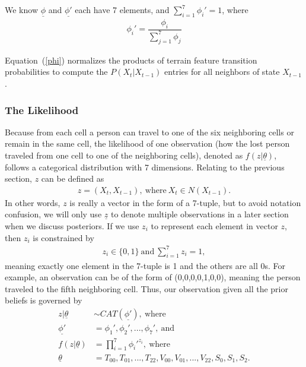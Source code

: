 \documentclass[smallextended,natbib]{svjour3}
\begin{document}
We know $\underline{\phi}$ and $\underline{\phi'}$ each have 7 elements, and $\sum_{i=1}^7 \phi_i' = 1$, where
\begin{align}
\label{phi}
\phi_i' = \dfrac{\phi_i}{\sum_{j=1}^7 \phi_j}
\end{align}

Equation~(\ref{phi}) normalizes the products of terrain feature transition probabilities to compute the $P(X_t|X_{t-1})$ entries for all neighbors of state $X_{t-1}$.

\subsubsection{The Likelihood}
\label{sec:3.4.3}

Because from each cell a person can travel to one of the six neighboring cells or remain in the same cell, the likelihood of one observation (how the lost person traveled from one cell to one of the neighboring cells), denoted as $f(z|\underline{\theta})$, follows a categorical distribution with 7 dimensions. Relating to the previous section, $z$ can be defined as
\begin{align}
z = (X_t, X_{t-1}), ~\mathrm{where}~ X_t \in N(X_{t-1}).
\end{align}
In other words, $z$ is really a vector in the form of a 7-tuple, but to avoid notation confusion, we will only use $\underline{z}$ to denote multiple observations in a later section when we discuss posteriors. If we use $z_i$ to represent each element in vector $z$, then $z_i$ is constrained by
\begin{align}
\label{}
z_i \in \{0,1\} ~\mathrm{and}~ \sum_{i=1}^7 z_i=1,
\end{align}
meaning exactly one element in the 7-tuple is 1 and the others are all 0s. For example, an observation can be of the form of (0,0,0,0,1,0,0), meaning the person traveled to the fifth neighboring cell. Thus, our observation given all the prior beliefs is governed by
\begin{align}
\label{CAT}
z|\underline{\theta} &\sim CAT(\underline{\phi'}), ~\mathrm{where}\\
\underline{\phi'} &= \phi_1', \phi_2', ..., \phi_7', ~\mathrm{and}\\
\label{likelihood}
f(z|\underline{\theta}) &= \prod_{i=1}^7 \phi_i'^{z_i},~\mathrm{where}\\
\underline{\theta} &= T_{00},T_{01},...,T_{22},V_{00},V_{01},...,V_{22},S_0,S_1,S_2.
\end{align}
\end{document}
